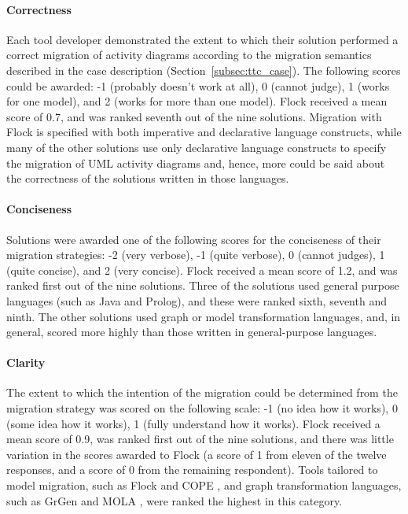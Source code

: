 \paragraph{Correctness} Each tool developer demonstrated the extent to which their solution performed a correct migration of activity diagrams according to the migration semantics described in the case description (Section~\ref{subsec:ttc_case}). The following scores could be awarded: -1 (probably doesn't work at all), 0 (cannot judge), 1 (works for one model), and 2 (works for more than one model). Flock received a mean score of 0.7, and was ranked seventh out of the nine solutions. Migration with Flock is specified with both imperative and declarative language constructs, while many of the other solutions use only declarative language constructs to specify the migration of UML activity diagrams and, hence, more could be said about the correctness of the solutions written in those languages.

\paragraph{Conciseness} Solutions were awarded one of the following scores for the conciseness of their migration strategies: -2 (very verbose), -1 (quite verbose), 0 (cannot judges), 1 (quite concise), and 2 (very concise). Flock received a mean score of 1.2, and was ranked first out of the nine solutions. Three of the solutions used general purpose languages (such as Java and Prolog), and these were ranked sixth, seventh and ninth. The other solutions used graph or model transformation languages, and, in general, scored more highly than those written in general-purpose languages.

\paragraph{Clarity} The extent to which the intention of the migration could be determined from the migration strategy was scored on the following scale: -1 (no idea how it works), 0 (some idea how it works), 1 (fully understand how it works). Flock received a mean score of 0.9, was ranked first out of the nine solutions, and there was little variation in the scores awarded to Flock (a score of 1 from eleven of the twelve responses, and a score of 0 from the remaining respondent). Tools tailored to model migration, such as Flock and COPE \cite{herrmannsdoerfer09cope}, and graph transformation languages, such as GrGen \cite{grgen} and MOLA \cite{mola}, were ranked the highest in this category.


